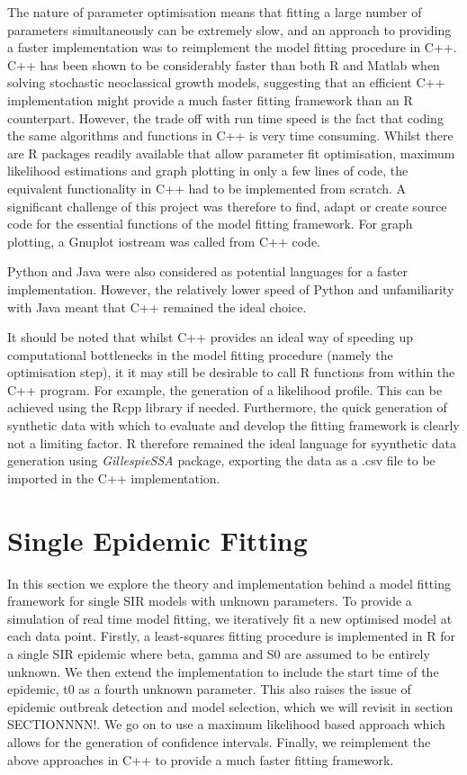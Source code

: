 \documentclass[11pt, a4paper, oneside,titlepage]{article}
\begin{document}
The nature of parameter optimisation means that fitting a large number
of parameters simultaneously can be extremely slow, and an approach to
providing a faster implementation was to reimplement the model fitting
procedure in C++. C++ has been shown to be considerably faster than
both R and Matlab when solving stochastic neoclassical growth models,
suggesting that an efficient C++ implementation might provide a much
faster fitting framework than an R counterpart.\cite{languagespeed}
However, the trade off with run time speed is the fact that coding the
same algorithms and functions in C++ is very time consuming. Whilst
there are R packages readily available that allow parameter fit optimisation,
maximum likelihood estimations and graph plotting in only a few lines
of code, the equivalent functionality in C++ had to be implemented
from scratch. A significant challenge of this project was therefore to
find, adapt or create source code for the essential functions of the
model fitting framework. For graph plotting, a Gnuplot iostream was called from C++
code. 

Python and Java were also considered as potential languages for a
faster implementation. However, the relatively lower speed of Python and
unfamiliarity with Java meant that C++ remained the ideal choice.

It should be noted that whilst C++ provides an ideal way of speeding
up computational bottlenecks in the model fitting procedure (namely
the optimisation step), it it may still be desirable to call R
functions from within the C++ program. For example, the generation of
a likelihood profile. This can be achieved using the
Rcpp library if needed. Furthermore, the quick generation of synthetic
data with which to evaluate and develop the fitting framework is
clearly not a limiting factor. R therefore remained the ideal language
for syynthetic data generation using \emph{GillespieSSA} package,
exporting the data as a .csv file to be imported in the C++ implementation. 

 
\section{Single Epidemic Fitting}
In this section we explore the theory and implementation behind a
model fitting framework for single SIR models with unknown
parameters. To provide a simulation of real time model fitting, we
iteratively fit a new optimised model at each data point. Firstly, a
least-squares fitting procedure is implemented in R for a single SIR
epidemic where beta, gamma and S0 are assumed to be entirely
unknown. We then extend the implementation to include the start time
of the epidemic, t0 as a fourth unknown parameter. This also raises
the issue of epidemic outbreak detection and model selection, which we
will revisit in section SECTIONNNN!. We go on to use a maximum
likelihood based approach which allows for the generation of
confidence intervals. Finally, we reimplement the above approaches in
C++ to provide a much faster fitting framework.
\end{document}
